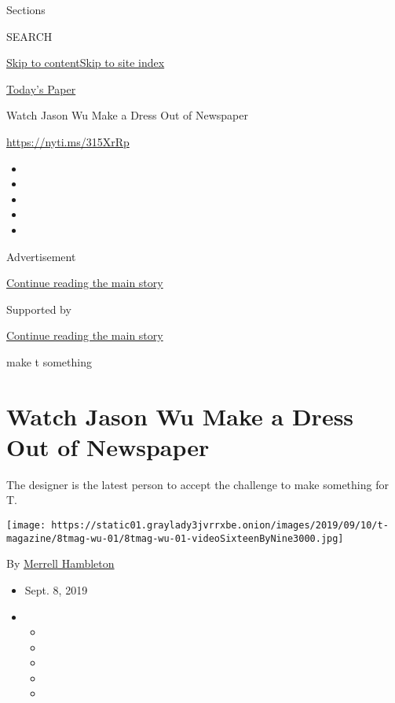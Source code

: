 Sections

SEARCH

\protect\hyperlink{site-content}{Skip to
content}\protect\hyperlink{site-index}{Skip to site index}

\href{https://myaccount.nytimes3xbfgragh.onion/auth/login?response_type=cookie\&client_id=vi}{}

\href{https://www.nytimes3xbfgragh.onion/section/todayspaper}{Today's
Paper}

Watch Jason Wu Make a Dress Out of Newspaper

\url{https://nyti.ms/315XrRp}

\begin{itemize}
\item
\item
\item
\item
\item
\end{itemize}

Advertisement

\protect\hyperlink{after-top}{Continue reading the main story}

Supported by

\protect\hyperlink{after-sponsor}{Continue reading the main story}

make t something

\hypertarget{watch-jason-wu-make-a-dress-out-of-newspaper}{%
\section{Watch Jason Wu Make a Dress Out of
Newspaper}\label{watch-jason-wu-make-a-dress-out-of-newspaper}}

The designer is the latest person to accept the challenge to make
something for T.

\texttt{[image: https://static01.graylady3jvrrxbe.onion/images/2019/09/10/t-magazine/8tmag-wu-01/8tmag-wu-01-videoSixteenByNine3000.jpg]}

By
\href{https://www.nytimes3xbfgragh.onion/by/merrell-hambleton}{Merrell
Hambleton}

\begin{itemize}
\item
  Sept. 8, 2019
\item
  \begin{itemize}
  \item
  \item
  \item
  \item
  \item
  \end{itemize}
\end{itemize}

